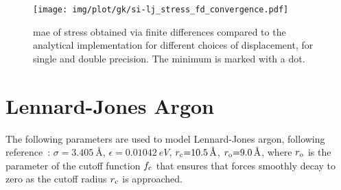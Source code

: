 
\begin{figure}
  \texttt{[image: img/plot/gk/si-lj\_stress\_fd\_convergence.pdf]}
  \caption{
  \gls{mae} of stress obtained via finite differences compared to the analytical implementation for different choices of displacement, for single and double precision. The minimum is marked with a dot.
  }
  \label{fig:si-glps_lj_stress_fd_convergence_32}
\end{figure}


%     





\section{Lennard-Jones Argon}
\label{sec:lj-ar}

The following parameters are used to model Lennard-Jones argon, following reference~\cite{mk2004t}:
$\sigma{=}\qty{3.405}{\angstrom}$, $\epsilon{=}\qty{0.01042}{eV}$, $r_{\text{c}}{=}\qty{10.5}{\angstrom}$, $r_{\text{o}}{=}\qty{9.0}{\angstrom}$,
where $r_{\text{o}}$ is the  parameter of the cutoff function $f_{\text{c}}$ that ensures that forces smoothly decay to zero as the cutoff radius $r_{\text{c}}$ is approached.

